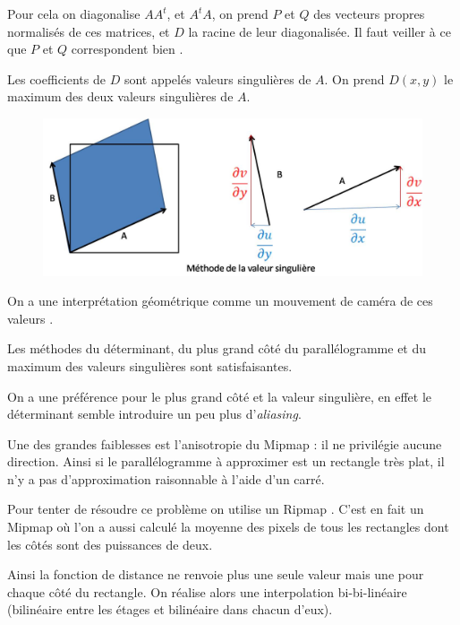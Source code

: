 Pour cela on diagonalise $AA^t$, et $A^tA$, on prend $P$ et $Q$ des vecteurs propres normalisés de ces matrices, et $D$ la racine de leur diagonalisée. Il faut veiller à ce que $P$ et $Q$ correspondent bien \cite{abdi2007singular}.

Les coefficients de $D$ sont appelés valeurs singulières de $A$. On prend $D(x,y)$ le maximum des deux valeurs singulières de $A$.


\begin{figure}[h!]
\centering
\includegraphics[scale=0.5]{methode_valeur_singuliere.jpg}
\end{figure}

On a une interprétation géométrique comme un mouvement de caméra de ces valeurs \cite{morel2009asift}.


Les méthodes du déterminant, du plus grand côté du parallélogramme et du maximum des valeurs singulières sont satisfaisantes.

On a une préférence pour le plus grand côté et la valeur singulière, en effet le déterminant semble introduire un peu plus d'\emph{aliasing}.


Une des grandes faiblesses est l'anisotropie du Mipmap : il ne privilégie aucune direction. Ainsi si le parallélogramme à approximer est un rectangle très plat, il n'y a pas d'approximation raisonnable à l'aide d'un carré.

Pour tenter de résoudre ce problème on utilise un Ripmap \cite{akenine2008real}. C'est en fait un Mipmap où l'on a aussi calculé la moyenne des pixels de tous les rectangles dont les côtés sont des puissances de deux.

Ainsi la fonction de distance ne renvoie plus une seule valeur mais une pour chaque côté du rectangle. On réalise alors une interpolation bi-bi-linéaire (bilinéaire entre les étages et bilinéaire dans chacun d'eux).%



